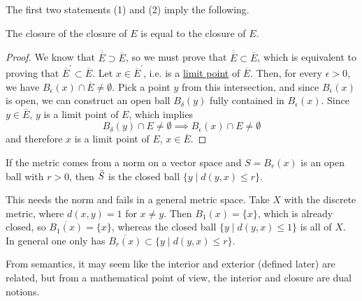   The first two statements (1) and (2) imply the following. 

  \begin{corollary}
    \label{thm:idempotence-of-the-closure}
    The closure of the closure of $E$ is equal to the closure of $E$. 
  \end{corollary}
  \begin{proof}
    We know that $\overline{\overline{E}} \supset \overline{E}$, so we must prove that $\overline{\overline{E}} \subset \overline{E}$, which is equivalent to proving that $\overline{E}^\prime \subset \overline{E}$. Let $x \in \overline{E}^\prime$, i.e. is a \hyperref[def:limit-point]{limit point} of $\overline{E}$. Then, for every $\epsilon > 0$, we have $B_\epsilon (x) \cap \overline{E} \neq \emptyset$. Pick a point $y$ from this intersection, and since $B_\epsilon (x)$ is open, we can construct an open ball $B_\delta (y)$ fully contained in $B_\epsilon (x)$. Since $y \in \overline{E}$, $y$ is a limit point of $E$, which implies 
    \begin{equation}
      B_\delta (y) \cap E \neq \emptyset \implies B_\epsilon (x) \cap E \neq \emptyset
    \end{equation}
    and therefore $x$ is a limit point of $E$, $x \in \overline{E}$. 
  \end{proof}
  

  \begin{example}
    \label{ex:closure-of-an-open-ball}
    If the metric comes from a norm on a vector space and $S = B_r(x)$ is an open ball with $r > 0$, then $\Bar{S}$ is the closed ball $\{y \mid d(y, x) \leq r\}$. 

    This needs the norm and fails in a general metric space. Take $X$ with the discrete metric, where $d(x, y) = 1$ for $x \neq y$. Then $B_1(x) = \{x\}$, which is already closed, so $\overline{B_1(x)} = \{x\}$, whereas the closed ball $\{y \mid d(y,x) \leq 1\}$ is all of $X$. In general one only has $\overline{B_r(x)} \subset \{y \mid d(y,x) \leq r\}$. 
  \end{example}

  From semantics, it may seem like the interior and exterior (defined later) are related, but from a mathematical point of view, the interior and closure are dual notions. 

